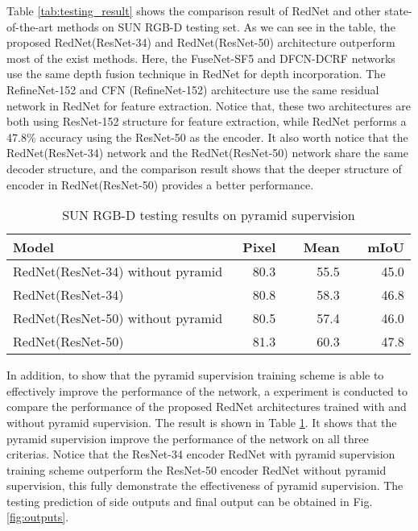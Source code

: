 \documentclass[runningheads]{llncs}
\begin{document}
Table \ref{tab:testing_result} shows the comparison result of RedNet and other state-of-the-art methods on SUN RGB-D testing set. As we can see in the table, the proposed RedNet(ResNet-34) and RedNet(ResNet-50) architecture outperform most of the exist methods. Here, the FuseNet-SF5 \cite{hazirbas2016fusenet} and DFCN-DCRF \cite{jiang2017incorporating} networks use the same depth fusion technique in RedNet for depth incorporation. The RefineNet-152 \cite{lin2017refinenet} and CFN (RefineNet-152) \cite{lin2017cascaded} architecture use the same residual network in RedNet for feature extraction. Notice that, these two architectures are both using ResNet-152 structure for feature extraction, while RedNet performs a 47.8\% accuracy using the ResNet-50 as the encoder. It also worth notice that the RedNet(ResNet-34) network and the RedNet(ResNet-50) network share the same decoder structure, and the comparison result shows that the deeper structure of encoder in RedNet(ResNet-50) provides a better performance.

\begin{table}[t]
    \small
    \caption{SUN RGB-D testing results on pyramid supervision}
    \label{tab:pyramid_result}
    \centering
    \begin{tabular}{ l r r r }
        \toprule
        Model                    &~Pixel &~~Mean &~~mIoU     \\
        \midrule
      RedNet(ResNet-34) without pyramid   &80.3 &55.5 &45.0           \\
        RedNet(ResNet-34)                  &80.8 &58.3 &46.8  \\
      RedNet(ResNet-50) without pyramid  &80.5 &57.4 &46.0 \\
        RedNet(ResNet-50)                  &81.3 &60.3 &47.8 \\
        \bottomrule
    \end{tabular}
\end{table}

In addition, to show that the pyramid supervision training scheme is able to effectively improve the performance of the network, a experiment is conducted to compare the performance of the proposed RedNet architectures trained with and without pyramid supervision. The result is shown in Table \ref{tab:pyramid_result}. It shows that the pyramid supervision improve the performance of the network on all three criterias. Notice that the ResNet-34 encoder RedNet with pyramid supervision training scheme outperform the ResNet-50 encoder RedNet without pyramid supervision, this fully demonstrate the effectiveness of pyramid supervision. The testing prediction of side outputs and final output can be obtained in Fig. \ref{fig:outputs}.
\end{document}
